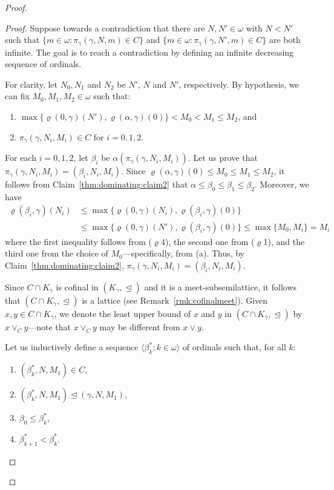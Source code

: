 \documentclass[]{amsart}
\theoremstyle{definition}
\theoremstyle{remark}
\begin{document}
\begin{proof}
\begin{proof}
Suppose towards a contradiction that there are $N, N' \in \omega$ with $N < N'$ such that $\{m \in \omega : \pi_\gamma (\gamma, N, m) \in C\}$ and $\{m \in \omega : \pi_\gamma (\gamma, N', m) \in C\}$ are both infinite. The goal is to reach a contradiction by defining an infinite decreasing sequence of ordinals. 

For clarity, let $N_0, N_1$ and $N_2$ be $N'$, $N$ and $N'$, respectively.
By hypothesis, we can fix $M_0, M_1, M_2 \in \omega$ such that:
\begin{enumerate}[label=(\alph*)]
\item $\max \{\varrho(0, \gamma)(N'), \varrho(\alpha, \gamma)(0)\} < M_0 < M_1 \le M_2$, and
\item $\pi_\gamma (\gamma, N_i, M_i) \in C$ for $i = 0,1,2$.
\end{enumerate}

For each $i = 0,1,2$, let $\beta_i$ be $\alpha(\pi_\gamma (\gamma, N_i, M_i))$. Let us prove that $\pi_\gamma (\gamma, N_i, M_i) = (\beta_i, N_i, M_i)$. Since $\varrho(\alpha, \gamma)(0) \le M_0 \le M_1 \le M_2$, it follows from Claim~\ref{thm:dominating:claim2} that $\alpha \le \beta_0 \le \beta_1 \le \beta_2$. Moreover, we have 
\begin{align*}
\varrho(\beta_i, \gamma)(N_i) &\le \max \{\varrho(0, \gamma)(N_i), \varrho(\beta_i, \gamma)(0)\}\\&\le \max \{\varrho(0, \gamma)(N'), \varrho(\beta_i, \gamma)(0)\} \le \max\{M_0, M_i\} = M_i
\end{align*}
where the first inequality follows from ($\varrho$4), the second one from ($\varrho$1), and the third one from the choice of $M_0$---specifically, from (a).
Thus, by Claim~\ref{thm:dominating:claim2}, $\pi_\gamma (\gamma, N_i, M_i) = (\beta_i, N_i, M_i)$. 

Since $C \cap K_\gamma$ is cofinal in $(K_\gamma, \trianglelefteq)$ and it is a meet-subsemilattice, it follows that $(C \cap K_\gamma, \trianglelefteq)$ is a lattice (see Remark~\ref{rmk:cofinalmeet}). Given $x,y \in C \cap K_\gamma$, we denote the least upper bound of $x$ and $y$ in $(C \cap K_\gamma, \trianglelefteq)$ by $x \vee_C y$---note that $x \vee_C y$ may be different from $x \vee y$. 

 
Let us inductively define a sequence $\langle \beta^*_k : k \in \omega\rangle$ of ordinals such that, for all $k$:
\begin{enumerate}[label=(\Alph*)]
\item $(\beta^*_k, N, M_1) \in C$,
\item $(\beta^*_k, N, M_1) \trianglelefteq (\gamma, N, M_1)$,
\item $\beta_0 \le \beta^*_{k}$,
\item $\beta^*_{k+1} < \beta^*_k$.
\end{enumerate}


\end{proof}
\end{proof}
\end{document}
